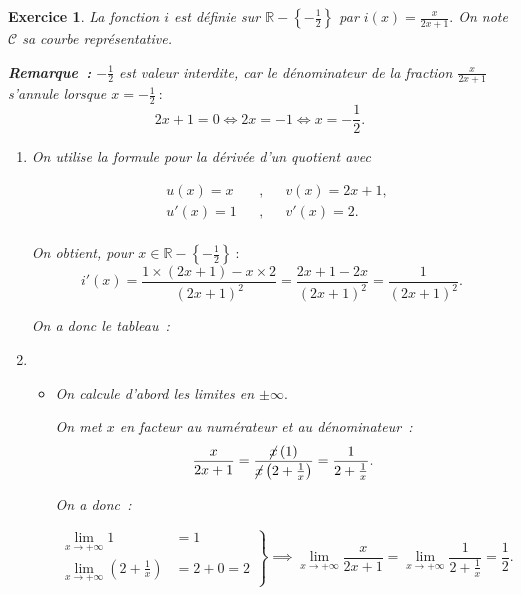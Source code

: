 \documentclass[10pt]{article}
\newtheorem{exo}{Exercice}
\begin{document}
\begin{exo}

La fonction $i$ est définie sur $\mathbb{R}-\left\{-\frac{1}{2}\right\}$ par $i(x)=\frac{x}{2x+1}.$ On note $\mathcal{C}$ sa courbe représentative.


\medskip
 
\textbf{Remarque~:} $-\frac{1}{2}$ est valeur interdite, car le dénominateur de la fraction $\frac{x}{2x+1}$ s'annule lorsque $x=-\frac{1}{2}~:$
\[2x+1=0\iff 2x=-1\iff x=-\frac{1}{2}.\]
\begin{enumerate}
\item

\setlength{\columnseprule}{1pt}

\begin{multicols}{2}

On utilise la formule pour la dérivée d'un quotient avec

\begin{align*}
&u(x)=x&&,&& v(x)=2x+1, \\
& u'(x)=1&&, &&v'(x)=2.\\
\end{align*}


On obtient, pour $x\in \mathbb{R}-\left\{-\frac{1}{2}\right\}~:$
\[i'(x)=\frac{1\times(2x+1)-x\times 2}{\left(2x+1\right)^2}=\frac{2x+1-2x}{\left(2x+1\right)^2}=\frac{1}{\left(2x+1\right)^2}.\]

On a donc le tableau~:

\medskip
\begin{center}
\end{center}
\end{multicols}
\item \begin{itemize}
\item[\textbullet] On calcule d'abord les limites en $\pm \infty.$

On met $x$ en facteur au numérateur et au dénominateur~:
\[\frac{x}{2x+1}=\frac{\cancel{x}\left(1\right)}{\cancel{x}\left(2+\frac{1}{x}\right)}=\frac{1}{2+\frac{1}{x}}.\]

On a donc~:


\[
\left.
    \begin{array}{ll}
        \lim\limits_{x\to +\infty}1&= 1\\
        \lim\limits_{x\to +\infty}\left(2+\frac{1}{x}\right) &= 2+0=2
    \end{array}
\right \}\implies \lim\limits_{x\to +\infty}\frac{x}{2x+1}=\lim\limits_{x\to +\infty}\frac{1}{2+\frac{1}{x}}= \frac{1}{2}.
\]


\end{itemize}
\end{enumerate}
\end{exo}
\end{document}

